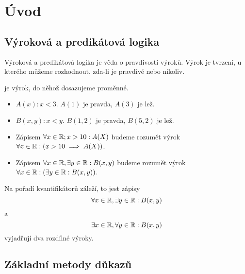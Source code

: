 \section{Úvod}

\subsection{Výroková a predikátová logika}

Výroková a predikátová logika je věda o pravdivosti výroků. Výrok je tvrzení,
u kterého můžeme rozhodnout, zda-li je pravdivé nebo nikoliv.

\begin{definition} 
     je výrok, do něhož dosazujeme proměnné.
\end{definition}

\begin{remark}
    \leavevmode
    \begin{itemize}
        \item $A(x): x < 3.$ $A(1)$ je pravda, $A(3)$ je lež.
        \item $B(x,y): x < y.$ $B(1,2)$ je pravda, $B(5,2)$ je lež.
    \end{itemize}
\end{remark}

\begin{remark}
    \leavevmode
    \begin{itemize}
        \item Zápisem $\forall x \in \mathbb{R}; x > 10: A(X)$ budeme rozumět výrok
            $\forall x \in \mathbb{R}: (x > 10 \implies A(X))$.
        \item Zápisem $\forall x \in \mathbb{R}, \exists y \in \mathbb{R}: B(x,y)$ budeme
            rozumět výrok $\forall x \in \mathbb{R}: (\exists y \in \mathbb{R}: B(x,y))$.
    \end{itemize}
\end{remark}

\begin{remark}
    Na pořadí kvantifikátorů záleží, to jest zápisy 
    $$\forall x \in \mathbb{R}, \exists y \in \mathbb{R}: B(x,y)$$
    a 
    $$\exists x \in \mathbb{R}, \forall y \in \mathbb{R}: B(x,y)$$
    vyjadřují dva rozdílné výroky.
\end{remark}

\subsection{Základní metody důkazů}

